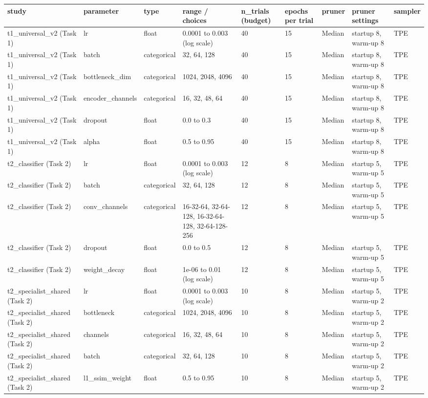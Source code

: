 \begin{tabular}{lllllllll}
\hline
study & parameter & type & range / choices & n\_trials (budget) & epochs per trial & pruner & pruner settings & sampler \\
\hline
t1\_universal\_v2 (Task 1) & lr & float & 0.0001 to 0.003 (log scale) & 40 & 15 & Median & startup 8, warm-up 8 & TPE \\
t1\_universal\_v2 (Task 1) & batch & categorical & {32, 64, 128} & 40 & 15 & Median & startup 8, warm-up 8 & TPE \\
t1\_universal\_v2 (Task 1) & bottleneck\_dim & categorical & {1024, 2048, 4096} & 40 & 15 & Median & startup 8, warm-up 8 & TPE \\
t1\_universal\_v2 (Task 1) & encoder\_channels & categorical & {16, 32, 48, 64} & 40 & 15 & Median & startup 8, warm-up 8 & TPE \\
t1\_universal\_v2 (Task 1) & dropout & float & 0.0 to 0.3 & 40 & 15 & Median & startup 8, warm-up 8 & TPE \\
t1\_universal\_v2 (Task 1) & alpha & float & 0.5 to 0.95 & 40 & 15 & Median & startup 8, warm-up 8 & TPE \\
t2\_classifier (Task 2) & lr & float & 0.0001 to 0.003 (log scale) & 12 & 8 & Median & startup 5, warm-up 5 & TPE \\
t2\_classifier (Task 2) & batch & categorical & {32, 64, 128} & 12 & 8 & Median & startup 5, warm-up 5 & TPE \\
t2\_classifier (Task 2) & conv\_channels & categorical & {16-32-64, 32-64-128, 16-32-64-128, 32-64-128-256} & 12 & 8 & Median & startup 5, warm-up 5 & TPE \\
t2\_classifier (Task 2) & dropout & float & 0.0 to 0.5 & 12 & 8 & Median & startup 5, warm-up 5 & TPE \\
t2\_classifier (Task 2) & weight\_decay & float & 1e-06 to 0.01 (log scale) & 12 & 8 & Median & startup 5, warm-up 5 & TPE \\
t2\_specialist\_shared (Task 2) & lr & float & 0.0001 to 0.003 (log scale) & 10 & 8 & Median & startup 5, warm-up 2 & TPE \\
t2\_specialist\_shared (Task 2) & bottleneck & categorical & {1024, 2048, 4096} & 10 & 8 & Median & startup 5, warm-up 2 & TPE \\
t2\_specialist\_shared (Task 2) & channels & categorical & {16, 32, 48, 64} & 10 & 8 & Median & startup 5, warm-up 2 & TPE \\
t2\_specialist\_shared (Task 2) & batch & categorical & {32, 64, 128} & 10 & 8 & Median & startup 5, warm-up 2 & TPE \\
t2\_specialist\_shared (Task 2) & l1\_ssim\_weight & float & 0.5 to 0.95 & 10 & 8 & Median & startup 5, warm-up 2 & TPE \\
\hline
\end{tabular}
